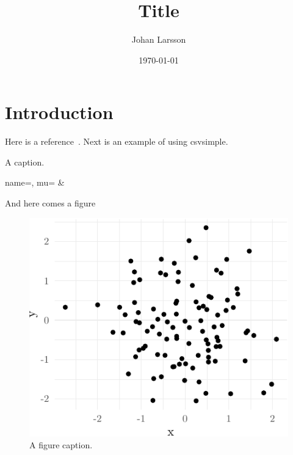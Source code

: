 \documentclass[english,a4paper]{article}
\title{Title}
\author{Johan Larsson}
\affil{The Department of Statistics, Lund University}
\date{\today}
\begin{document}
\maketitle

\begin{abstract}
\end{abstract}

\hypertarget{introduction}{%
  \section{Introduction}\label{introduction}}

Here is a reference~\autocite{larsson2020c}. Next is an example of using
csvsimple.

\begin{table}[hbtp]
  \caption{A caption.\label{tab:table-ref}}
  {name=\name, mu=\mu}%
  {\name & \mu}
\end{table}

And here comes a figure

\begin{figure}[hbtp]
  \centering
  \includegraphics{figures/plot.pdf}
  \caption{A figure caption.\label{fig:figure1}}
\end{figure}

\printbibliography
\end{document}
